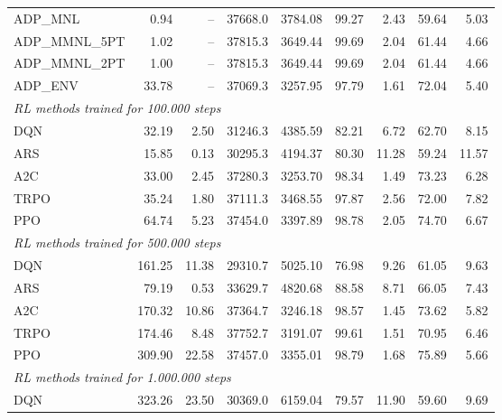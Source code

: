 \begin{samepage}
\begin{center}
\begin{tabular}{l|rr|rr|rr|rr}
    \midrule
    ADP\_MNL     &     0.94 &    -- &    37668.0 &    3784.08 &   99.27 &    2.43 &   59.64 &    5.03 \\
    ADP\_MMNL\_5PT &     1.02 &    -- &    37815.3 &    3649.44 &   99.69 &    2.04 &   61.44 &    4.66 \\
    ADP\_MMNL\_2PT &     1.00 &    -- &    37815.3 &    3649.44 &   99.69 &    2.04 &   61.44 &    4.66 \\
    ADP\_ENV     &    33.78 &    -- &    37069.3 &    3257.95 &   97.79 &    1.61 &   72.04 &    5.40 \\
    \midrule
    \multicolumn{9}{l}{\textit{RL methods trained for 100.000 steps}} \\
    \midrule
    DQN          &    32.19 &     2.50 &    31246.3 &    4385.59 &   82.21 &    6.72 &   62.70 &    8.15 \\
    ARS          &    15.85 &     0.13 &    30295.3 &    4194.37 &   80.30 &   11.28 &   59.24 &   11.57 \\
    A2C          &    33.00 &     2.45 &    37280.3 &    3253.70 &   98.34 &    1.49 &   73.23 &    6.28 \\
    TRPO         &    35.24 &     1.80 &    37111.3 &    3468.55 &   97.87 &    2.56 &   72.00 &    7.82 \\
    PPO          &    64.74 &     5.23 &    37454.0 &    3397.89 &   98.78 &    2.05 &   74.70 &    6.67 \\
    \midrule
    \multicolumn{9}{l}{\textit{RL methods trained for 500.000 steps}} \\
    \midrule
    DQN          &   161.25 &    11.38 &    29310.7 &    5025.10 &   76.98 &    9.26 &   61.05 &    9.63 \\
    ARS          &    79.19 &     0.53 &    33629.7 &    4820.68 &   88.58 &    8.71 &   66.05 &    7.43 \\
    A2C          &   170.32 &    10.86 &    37364.7 &    3246.18 &   98.57 &    1.45 &   73.62 &    5.82 \\
    TRPO         &   174.46 &     8.48 &    37752.7 &    3191.07 &   99.61 &    1.51 &   70.95 &    6.46 \\
    PPO          &   309.90 &    22.58 &    37457.0 &    3355.01 &   98.79 &    1.68 &   75.89 &    5.66 \\
    \midrule
    \multicolumn{9}{l}{\textit{RL methods trained for 1.000.000 steps}} \\
    \midrule
    DQN          &   323.26 &    23.50 &    30369.0 &    6159.04 &   79.57 &   11.90 &   59.60 &    9.69 \\

\end{tabular}
\end{center}
\end{samepage}
